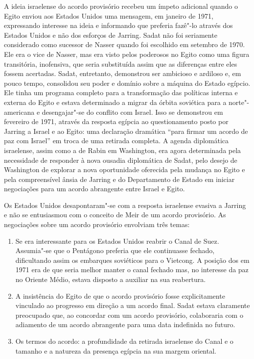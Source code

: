 A ideia israelense do acordo provisório recebeu um ímpeto adicional
quando o Egito enviou aos Estados Unidos uma mensagem, em janeiro de
1971, expressando interesse na ideia e informando que preferia fazê"-lo
através dos Estados Unidos e não dos esforços de Jarring. Sadat não foi
seriamente considerado como sucessor de Nasser quando foi escolhido em
setembro de 1970. Ele era o vice de Nasser, mas era visto pelos
poderosos no Egito como uma figura transitória, inofensiva, que seria
substituída assim que as diferenças entre eles fossem acertadas. Sadat,
entretanto, demonstrou ser ambicioso e ardiloso e, em pouco tempo,
consolidou seu poder e domínio sobre a máquina do Estado egípcio. Ele
tinha um programa completo para a transformação das políticas interna e
externa do Egito e estava determinado a migrar da órbita soviética para
a norte"-americana e desengajar"-se do conflito com Israel. Isso se
demonstrou em fevereiro de 1971, através da resposta egípcia ao
questionamento posto por Jarring a Israel e ao Egito: uma declaração
dramática ``para firmar um acordo de paz com Israel'' em troca de uma
retirada completa. A agenda diplomática israelense, assim como a de
Rabin em Washington, era agora determinada pela necessidade de responder
à nova ousadia diplomática de Sadat, pelo desejo de Washington de
explorar a nova oportunidade oferecida pela mudança no Egito e pela
compreensível ânsia de Jarring e do Departamento de Estado em iniciar
negociações para um acordo abrangente entre Israel e Egito.

Os Estados Unidos desapontaram"-se com a resposta israelense evasiva a
Jarring e não se entusiasmou com o conceito de Meir de um acordo
provisório. As negociações sobre um acordo provisório envolviam três
temas:

\begin{enumerate}
\def\labelenumi{\arabic{enumi}.}
\item
  Se era interessante para os Estados Unidos reabrir o Canal de Suez. Assumia"-se
  que o Pentágono preferia que ele continuasse fechado, dificultando
  assim os embarques soviéticos para o Vietcong. A posição dos  em
  1971 era de que seria melhor manter o canal fechado mas, no interesse
  da paz no Oriente Médio, estava disposto a auxiliar na sua reabertura.
\item
  A insistência do Egito de que o acordo provisório fosse explicitamente
  vinculado ao progresso em direção a um acordo final. Sadat estava
  claramente preocupado que, ao concordar com um acordo provisório,
  colaboraria com o adiamento de um acordo abrangente para uma data
  indefinida no futuro.
\item
  Os termos do acordo: a profundidade da retirada israelense do Canal e
  o tamanho e a natureza da presença egípcia na sua margem oriental.
\end{enumerate}


